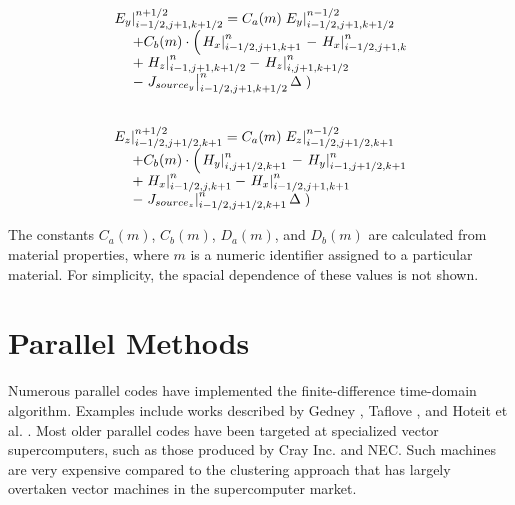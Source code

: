 \documentclass[11pt, conference, draftcls, letterpaper]{IEEEtran}
\begin{document}
\begin{equation}
  \label{eq:approxEy}
  \begin{array}{ll}
    \hspace{0.15cm} & \\
    \multicolumn{2}{l}{\left.  E_y \right|^{n+1/2}_{i-1/2,j+1,k+1/2} 
      = C_a(m) \left. E_y \right|^{n-1/2}_{i-1/2,j+1,k+1/2}} \\
    & + C_b(m) \cdot \left( \left. H_x \right|^{n}_{i-1/2,j+1,k+1} \right.
    - \left. H_x \right|^{n}_{i-1/2,j+1,k} \\
    & + \left. H_z \right|^{n}_{i-1,j+1,k+1/2} 
    - \left. H_z \right|^{n}_{i,j+1,k+1/2} \\
    & - \left. J_{source_y} \right|^{n}_{i-1/2,j+1,k+1/2} \Delta
    \left. \right)  

  \end{array}
\end{equation}

\begin{equation}
  \label{eq:approxEz}
  \begin{array}{ll}
    \hspace{0.15cm} & \\
    \multicolumn{2}{l}{\left.  E_z \right|^{n+1/2}_{i-1/2,j+1/2,k+1} 
      = C_a(m) \left. E_z \right|^{n-1/2}_{i-1/2,j+1/2,k+1}} \\
    & + C_b(m) \cdot \left( \left. H_y \right|^{n}_{i,j+1/2,k+1} \right.
    - \left. H_y \right|^{n}_{i-1,j+1/2,k+1} \\
    & + \left. H_x \right|^{n}_{i-1/2,j,k+1} 
    - \left. H_x \right|^{n}_{i-1/2,j+1,k+1} \\
    & - \left. J_{source_z} \right|^{n}_{i-1/2,j+1/2,k+1} \Delta
    \left.\right)    
  \end{array}
\end{equation}

%  

The constants $C_a(m)$, $C_b(m)$, $D_a(m)$, and $D_b(m)$ are calculated from
material properties, where $m$ is a numeric identifier assigned to a
particular material. For simplicity, the spacial dependence of these
values is not shown. 

\section{Parallel Methods}
Numerous parallel codes have implemented the finite-difference
time-domain algorithm. Examples include works described by Gedney
\cite{gedney1995}, Taflove \cite{taflove????}, and Hoteit et al.
\cite{hoteit1999}. Most older parallel codes have been targeted at
specialized vector supercomputers, such as those produced by Cray Inc.
and NEC. Such machines are very expensive compared to the clustering
approach \cite{becker1995} that has largely overtaken vector machines
in the supercomputer market.
\end{document}
